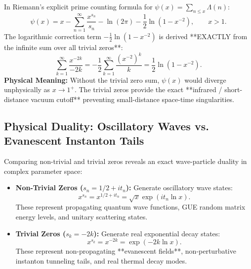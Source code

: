 \documentclass[11pt,a4paper]{article}
\begin{document}
In Riemann's explicit prime counting formula for $\psi(x) = \sum_{n \le x} \Lambda(n)$:
\begin{equation}
\psi(x) = x - \sum_{n=1}^\infty \frac{x^{s_n}}{s_n} - \ln(2\pi) - \frac{1}{2} \ln\left( 1 - x^{-2} \right), \qquad x > 1.
\end{equation}
The logarithmic correction term $-\frac{1}{2} \ln(1 - x^{-2})$ is derived **EXACTLY from the infinite sum over all trivial zeros**:
\begin{equation}
\sum_{k=1}^\infty \frac{x^{-2k}}{-2k} = -\frac{1}{2} \sum_{k=1}^\infty \frac{(x^{-2})^k}{k} = \frac{1}{2} \ln\left( 1 - x^{-2} \right).
\end{equation}
\textbf{Physical Meaning:} Without the trivial zero sum, $\psi(x)$ would diverge unphysically as $x \to 1^+$. The trivial zeros provide the exact **infrared / short-distance vacuum cutoff** preventing small-distance space-time singularities.

\subsection{Physical Duality: Oscillatory Waves vs. Evanescent Instanton Tails}
Comparing non-trivial and trivial zeros reveals an exact wave-particle duality in complex parameter space:
\begin{itemize}
    \item \textbf{Non-Trivial Zeros ($s_n = 1/2 + i t_n$):} Generate oscillatory wave states:
    \begin{equation}
    x^{s_n} = x^{1/2 + i t_n} = \sqrt{x} \exp(i t_n \ln x).
    \end{equation}
    These represent propagating quantum wave functions, GUE random matrix energy levels, and unitary scattering states.
    \item \textbf{Trivial Zeros ($s_k = -2k$):} Generate real exponential decay states:
    \begin{equation}
    x^{s_k} = x^{-2k} = \exp(-2k \ln x).
    \end{equation}
    These represent non-propagating **evanescent fields**, non-perturbative instanton tunneling tails, and real thermal decay modes.
\end{itemize}
\end{document}
